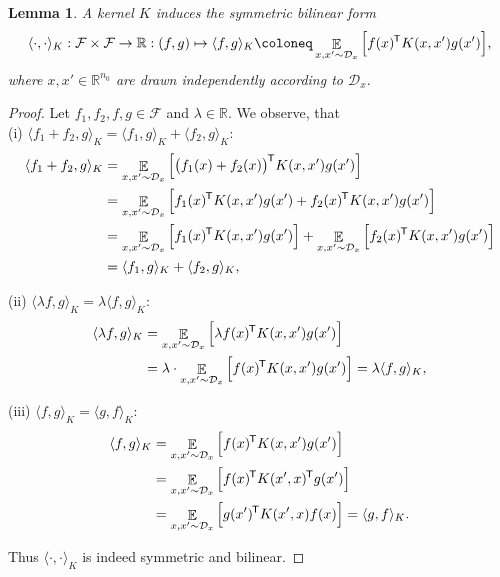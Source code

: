 \documentclass[11pt, a4paper]{article}
\newtheorem{lemma}[theorem]{Lemma}
\newcommand{\R}{\mathbb{R}}
\newcommand{\D}{\mathcal{D}}
\newcommand{\F}{\mathcal{F}}
\newcommand*{\tr}{^{\mkern-1.5mu\mathsf{T}}}
\DeclareMathOperator*{\E}{\mathbb{E}}
\begin{document}
\begin{lemma} \label{lem:form}
A kernel $K$ induces the symmetric bilinear form
\[ \langle \cdot, \cdot \rangle_K : \F \times \F \to \R : (f,g) \mapsto \langle f , g \rangle _K \coloneq \E_{x,x' \sim \D_x} \Big [ f(x)\tr  K(x,x') g(x') \Big ], \]
where $x, x' \in \R^{n_0}$ are drawn independently according to $\D_x$. 
\end{lemma}

\begin{proof}
Let $f_1, f_2, f, g \in \F$ and $\lambda \in \R$. We observe, that \\

(i) $\langle f_1 + f_2 , g \rangle_{K} = \langle f_1 , g \rangle_{K} + \langle f_2 , g \rangle_{K}$:
\[ \begin{split}
\langle f_1 + f_2 , g \rangle_{K}
&= \E_{x,x' \sim \D_x} \Big [ \big ( f_1(x) + f_2(x) \big )\tr K(x,x')g(x') \Big ] \\\
&= \E_{x,x' \sim \D_x} \Big [ f_1(x)\tr K(x,x')g(x') + f_2(x)\tr K(x,x')g(x') \Big ] \\\
&= \E_{x,x' \sim \D_x} \Big [ f_1(x)\tr K(x,x')g(x') \Big ] + \E_{x,x' \sim \D_x} \Big [ f_2(x)\tr K(x,x')g(x') \Big ] \\\
&= \langle f_1 , g \rangle_{K} + \langle f_2 , g \rangle_{K},
\end{split} \]

(ii) $\langle \lambda f , g \rangle_{K} = \lambda \langle f, g \rangle_{K}$:
\[ \begin{split} 
\langle \lambda f , g \rangle_{K} 
&= \E_{x,x' \sim \D_x} \Big [ \lambda f(x)\tr K(x,x')g(x') \Big ] \\\
&= \lambda \cdot \E_{x,x' \sim \D_x} \Big [ f(x)\tr K(x,x')g(x') \Big ] = \lambda \langle f, g \rangle_{K}, 
\end{split} \]

(iii) $\langle f , g \rangle_{K} = \langle g , f \rangle_{K}$:
\[ \begin{split} \langle f , g \rangle_{K} 
&= \E_{x,x' \sim \D_x} \Big [ f(x)\tr K(x,x')g(x') \Big ] \\\
&= \E_{x,x' \sim \D_x} \Big [ f(x)\tr K(x',x)\tr g(x') \Big ] \\\
&= \E_{x,x' \sim \D_x} \Big [ g(x')\tr K(x',x)f(x) \Big ] = \langle g , f \rangle_{K}.
\end{split} \]

Thus $\langle \cdot,\cdot \rangle_{K}$ is indeed symmetric and bilinear.
\end{proof}
\end{document}
